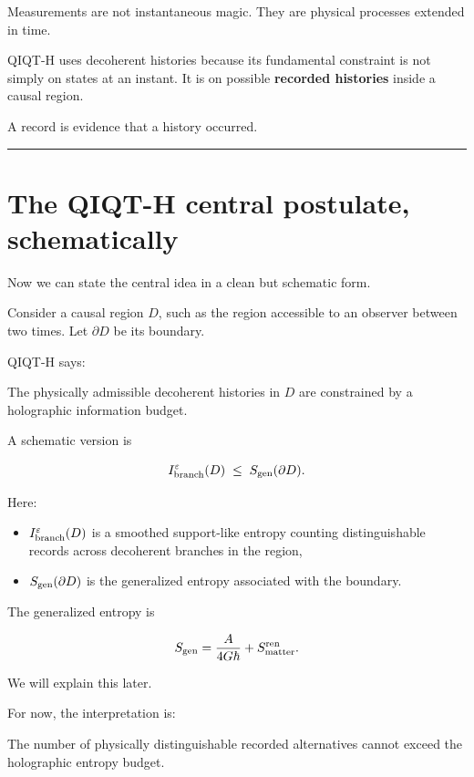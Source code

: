\documentclass[11pt,a4paper]{article}
\newenvironment{qiqtquote}{\begin{mdframed}[style=quotestyle]}{\end{mdframed}}
\begin{document}
Measurements are not instantaneous magic. They are physical processes extended in time.

QIQT-H uses decoherent histories because its fundamental constraint is not simply on states at an instant. It is on possible \textbf{recorded histories} inside a causal region.

A record is evidence that a history occurred.

\medskip\hrule\medskip

\section{The QIQT-H central postulate, schematically}

Now we can state the central idea in a clean but schematic form.

Consider a causal region $D$, such as the region accessible to an observer between two times. Let $\partial D$ be its boundary.

QIQT-H says:

\begin{qiqtquote}
The physically admissible decoherent histories in $D$ are constrained by a holographic information budget.
\end{qiqtquote}

A schematic version is

\[
I_{\rm branch}^{\varepsilon}(D)
\;\leq\;
S_{\rm gen}(\partial D).
\]

Here:

\begin{itemize}
  \item $I_{\rm branch}^{\varepsilon}(D)$ is a smoothed support-like entropy counting distinguishable records across decoherent branches in the region,
  \item $S_{\rm gen}(\partial D)$ is the generalized entropy associated with the boundary.
\end{itemize}

The generalized entropy is

\[
S_{\rm gen}
=
\frac{A}{4G\hbar}
+
S_{\rm matter}^{\rm ren}.
\]

We will explain this later.

For now, the interpretation is:

\begin{qiqtquote}
The number of physically distinguishable recorded alternatives cannot exceed the holographic entropy budget.
\end{qiqtquote}
\end{document}

